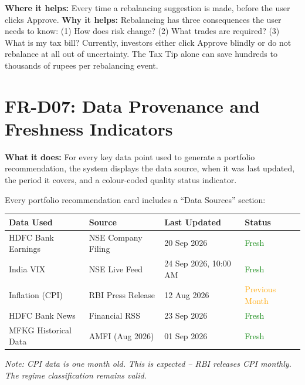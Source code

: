\documentclass[12pt, a4paper, openany, oneside]{report}
\begin{document}
\begin{valuebox}
\textbf{Where it helps:} Every time a rebalancing suggestion is made, before the user clicks Approve. \textbf{Why it helps:} Rebalancing has three consequences the user needs to know: (1) How does risk change? (2) What trades are required? (3) What is my tax bill? Currently, investors either click Approve blindly or do not rebalance at all out of uncertainty. The Tax Tip alone can save hundreds to thousands of rupees per rebalancing event.
\end{valuebox}

\section{FR-D07: Data Provenance and Freshness Indicators}

\textbf{What it does:} For every key data point used to generate a portfolio recommendation, the system displays the data source, when it was last updated, the period it covers, and a colour-coded quality status indicator.

\begin{examplebox}
Every portfolio recommendation card includes a ``Data Sources'' section:

\begin{center}
\begin{tabular}{|l|l|l|l|}
\hline
\textbf{Data Used} & \textbf{Source} & \textbf{Last Updated} & \textbf{Status} \\
\hline
HDFC Bank Earnings & NSE Company Filing & 20 Sep 2026 & \textcolor{green}{Fresh} \\
India VIX & NSE Live Feed & 24 Sep 2026, 10:00 AM & \textcolor{green}{Fresh} \\
Inflation (CPI) & RBI Press Release & 12 Aug 2026 & \textcolor{orange}{Previous Month} \\
HDFC Bank News & Financial RSS & 23 Sep 2026 & \textcolor{green}{Fresh} \\
MFKG Historical Data & AMFI (Aug 2026) & 01 Sep 2026 & \textcolor{green}{Fresh} \\
\hline
\end{tabular}
\end{center}

\textit{Note: CPI data is one month old. This is expected -- RBI releases CPI monthly. The regime classification remains valid.}
\end{examplebox}
\end{document}
